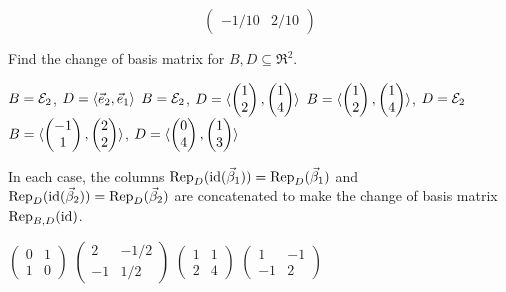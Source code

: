 \begin{exercises}
\begin{answer}
\begin{equation*}
\begin{pmatrix}
         -1/10  &2/10
        \end{pmatrix}
      \end{equation*}
    \end{answer}
  \recommended \item \label{exer:ChngeBasMatsRTwo}
    Find the change of basis matrix for \( B,D\subseteq\Re^2 \).
    \begin{exparts*}
      \partsitem \( B=\stdbasis_2 \),
        \( D=\sequence{\vec{e}_2,\vec{e}_1} \)
      \partsitem \( B=\stdbasis_2 \),
        \( D=\sequence{\colvec{1 \\ 2},\colvec{1 \\ 4}} \)
      \partsitem  \( B=\sequence{\colvec{1 \\ 2},\colvec{1 \\ 4}} \),
        \( D=\stdbasis_2 \)
      \partsitem  \( B=\sequence{\colvec{-1 \\ 1},\colvec{2 \\ 2}} \),
        \( D=\sequence{\colvec{0 \\ 4},\colvec{1 \\ 3}} \)
    \end{exparts*}
    \begin{answer}
      In each case, the columns 
      $\rep{\identity(\vec{\beta}_1)}{D}=\rep{\vec{\beta}_1}{D}$
      and $\rep{\identity(\vec{\beta}_2)}{D}=\rep{\vec{\beta}_2}{D}$
      are concatenated to make the change of basis matrix
      $\rep{\identity}{B,D}$.
      \begin{exparts*}
        \partsitem \( \begin{pmatrix}
                   0  &1  \\
                   1  &0
                 \end{pmatrix} \)
        \partsitem \( \begin{pmatrix}
                   2  &-1/2  \\
                   -1 &1/2
                 \end{pmatrix} \)
        \partsitem \( \begin{pmatrix}
                   1  &1     \\
                   2  &4
                 \end{pmatrix} \)
        \partsitem \( \begin{pmatrix}
                   1  &-1    \\
                  -1  &2
                 \end{pmatrix} \)
      \end{exparts*}  

\end{answer}
\end{exercises}
